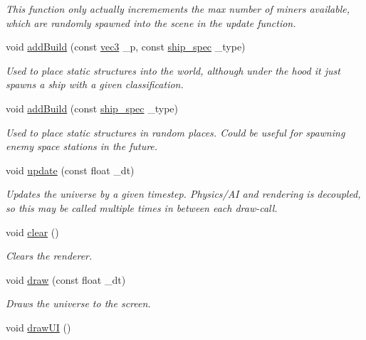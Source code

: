\begin{DoxyCompactItemize}
\begin{DoxyCompactList}\small\item\em This function only actually incremements the max number of miners available, which are randomly spawned into the scene in the update function. \end{DoxyCompactList}\item 
void \hyperlink{classuniverse_ad058c50da21f46d2eecb276254b79fb1}{add\-Build} (const \hyperlink{structvec3}{vec3} \-\_\-p, const \hyperlink{ship_8hpp_af74a63841701826d661cb9809aaf7092}{ship\-\_\-spec} \-\_\-type)
\begin{DoxyCompactList}\small\item\em Used to place static structures into the world, although under the hood it just spawns a ship with a given classification. \end{DoxyCompactList}\item 
void \hyperlink{classuniverse_aa7edd0f87d1ec40806203444edf84614}{add\-Build} (const \hyperlink{ship_8hpp_af74a63841701826d661cb9809aaf7092}{ship\-\_\-spec} \-\_\-type)
\begin{DoxyCompactList}\small\item\em Used to place static structures in random places. Could be useful for spawning enemy space stations in the future. \end{DoxyCompactList}\item 
void \hyperlink{classuniverse_a3b08f92bb3489f1181d2e8efd5346a56}{update} (const float \-\_\-dt)
\begin{DoxyCompactList}\small\item\em Updates the universe by a given timestep. Physics/\-A\-I and rendering is decoupled, so this may be called multiple times in between each draw-\/call. \end{DoxyCompactList}\item 
\hypertarget{classuniverse_a7a1e6c6398b6a51e5e86e1f31efbb895}{void \hyperlink{classuniverse_a7a1e6c6398b6a51e5e86e1f31efbb895}{clear} ()}\label{classuniverse_a7a1e6c6398b6a51e5e86e1f31efbb895}

\begin{DoxyCompactList}\small\item\em Clears the renderer. \end{DoxyCompactList}\item 
void \hyperlink{classuniverse_a12f3e6d74426ea1165947ec072995eeb}{draw} (const float \-\_\-dt)
\begin{DoxyCompactList}\small\item\em Draws the universe to the screen. \end{DoxyCompactList}\item 
\hypertarget{classuniverse_a2c7ae3efb623c29b37154726127c2d64}{void \hyperlink{classuniverse_a2c7ae3efb623c29b37154726127c2d64}{draw\-U\-I} ()}\label{classuniverse_a2c7ae3efb623c29b37154726127c2d64}


\end{DoxyCompactItemize}
